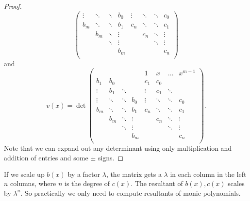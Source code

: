 \begin{proof}
\[\begin{pmatrix}
\vdots & \ddots & \ddots & b_0   & \vdots & \ddots & \ddots & c_0 \\
b_m    & \ddots & \ddots & b_1   & c_n    & \ddots & \ddots & c_1 \\
       & b_m    & \ddots & \vdots &        & c_n    & \ddots & \vdots \\
       &        & \ddots & \vdots    &        &        & \ddots & \vdots \\
       &        &        & b_m    &        &        &        & c_n \\
\end{pmatrix}
\]
and
\[
v(x)
=
\det
\begin{pmatrix}
       &        &        &        & 1      & x      & \dots & x^{m-1} \\
b_1    & b_0    &        &        & c_1    & c_0 \\
\vdots & b_1    & \ddots &        & \vdots & c_1 & \ddots & \\
\vdots & \ddots & \ddots & b_0    & \vdots & \ddots & \ddots & c_0 \\
b_m    & \ddots & \ddots & b_1    & c_n    & \ddots & \ddots & c_1 \\
       & b_m    & \ddots & \vdots &        & c_n    & \ddots & \vdots \\
       &        & \ddots & \vdots    &        &        & \ddots & \vdots \\
       &        &        & b_m    &        &        &        & c_n \\
\end{pmatrix}.
\]
Note that we can expand out any determinant using only multiplication and addition of entries and some \(\pm\) signs.
\end{proof}



If we scale up \(b(x)\) by a factor \(\lambda\), the matrix gets a \(\lambda\) in each column in the left \(n\) columns, where \(n\) is the degree of \(c(x)\).
The resultant of \(b(x),c(x)\) scales by \(\lambda^n\).
So practically we only need to compute resultants of monic polynomials.

